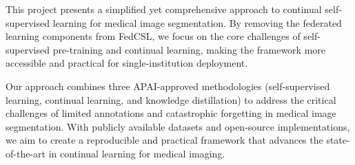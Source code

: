 \documentclass[conference]{IEEEtran}
\begin{document}
This project presents a simplified yet comprehensive approach to continual self-supervised learning for medical image segmentation. By removing the federated learning components from FedCSL, we focus on the core challenges of self-supervised pre-training and continual learning, making the framework more accessible and practical for single-institution deployment.

Our approach combines three APAI-approved methodologies (self-supervised learning, continual learning, and knowledge distillation) to address the critical challenges of limited annotations and catastrophic forgetting in medical image segmentation. With publicly available datasets and open-source implementations, we aim to create a reproducible and practical framework that advances the state-of-the-art in continual learning for medical imaging.
\end{document}
